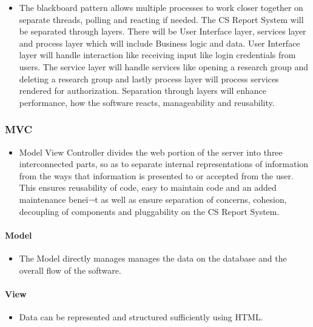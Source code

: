 \documentclass{article}
\begin{document}
		\begin{itemize}
			\item  The blackboard pattern allows multiple processes to work closer together on separate threads, 						polling and reacting if needed. The CS Report System will be separated through layers. There will be User 			Interface layer, services layer and process layer which will include Business logic and data.  User	 					Interface layer will handle interaction like receiving input like login credentials from users. The 						service layer will handle services like opening a research group and deleting a research group and lastly 			process layer will process services rendered for authorization. Separation through layers will enhance 					performance, how the software reacts,  manageability and reusability.
			
		\end{itemize} 
		
		
		
		\subsubsection{MVC} %
		\begin{itemize}
			\item  Model View Controller divides the web portion of the server into three interconnected parts, so as 					to 	separate internal representations of information from the ways that information is presented to or 					accepted from the user. This ensures reusability  of code, easy to maintain code and an added maintenance 			beneï¬t as well as ensure separation of concerns, cohesion, decoupling of components and pluggability on 					the CS 	Report System.
		\end{itemize}         	
		
		
		\paragraph{Model} %
		\begin{itemize}
			\item The Model directly manages manages the data on the database and the overall flow of the software.
		\end{itemize} 
		\paragraph{View} %
		\begin{itemize}
			\item Data can be represented and structured sufficiently using HTML.
		\end{itemize} 
\end{document}
